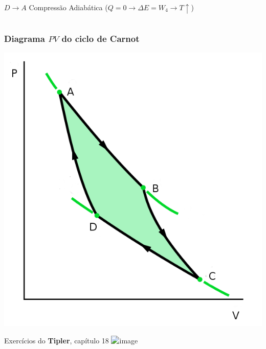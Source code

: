 \documentclass[t,%
brazilian,%
11pt,%
aspectratio=169,%
table%
]{beamer}
\begin{document}
\begin{frame}
\begin{columns}
\begin{column}{0.45\textwidth}
            \(D \rightarrow A\) Compressão Adiabática (\(Q=0 \rightarrow \Delta E = W_4 \rightarrow T \uparrow \))
        \end{column}
    \end{columns}
\end{frame}

\begin{frame}
    \frametitle{Diagrama \(PV\) do ciclo de Carnot}
    \centering
    \includegraphics[height=\textheight-27pt]{images/carnot-ciclo.png}
\end{frame}

\begin{frame}{Exercícios do \textbf{Tipler}, capítulo 18}
    \centering
    \includegraphics<+>[width=\textwidth]{images/Captura de tela de 2024-03-05 11-38-10.png}
\end{frame}

\end{document}
